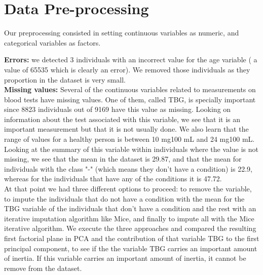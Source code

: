 \documentclass{article}
\begin{document}
\section{Data Pre-processing}

Our preprocessing consisted in setting continuous variables as numeric, and categorical variables as factors.

\textbf{Errors:} we detected 3 individuals with an incorrect value for the age variable ( a value of 65535 which is clearly an error). We removed those individuals as they proportion in the dataset is very small.\\
\textbf{Missing values:} Several of the continuous variables related to measurements on blood tests have missing values. One of them, called TBG, is specially important since  8823 individuals out of 9169 have this value as missing. Looking on information about the test associated with this variable, we see that it is an important measurement but that it is not usually done. We also learn that the range of values for a healthy person is between 10 mg\/100 mL and 24 mg\/100 mL. Looking at the summary of this variable within individuals where the value is not missing, we see that the mean in the dataset is 29.87, and that the mean for individuals with the class "-" (which means they don't have a condition) is 22.9, whereas for the individuals that have any of the conditions it is  47.72.\\ At that point we had three different options to proceed: to remove the variable, to impute the individuals that do not have a condition with the mean for the TBG variable of the individuals that don't have a condition and the rest with an iterative imputation algorithm like Mice, and finally to impute all with the Mice iterative algorithm. We execute the three approaches and compared the resulting first factorial plane in PCA and the contribution of that variable TBG to the first principal component, to see if the the variable TBG carries an important amount of inertia. If this variable carries an important amount of inertia, it cannot be remove from the dataset.
\end{document}
